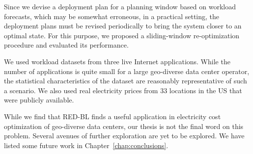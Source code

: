 Since we devise a deployment plan for a planning window based on workload forecasts, which may be somewhat erroneous, in a practical setting, the deployment plans must be revised periodically to bring the system closer to an optimal state. For this purpose, we proposed a sliding-window re-optimization procedure and evaluated its performance.

We used workload datasets from three live Internet applications. While the number of applications is quite small for a large geo-diverse data center operator, the statistical characteristics of the dataset are reasonably representative of such a scenario. We also used real electricity prices from 33 locations in the US that were publicly available.

While we find that RED-BL finds a useful application in electricity cost optimization of geo-diverse data centers, our thesis is not the final word on this problem. Several avenues of further exploration are yet to be explored. We have listed some future work in Chapter~\ref{chap:conclusions}.